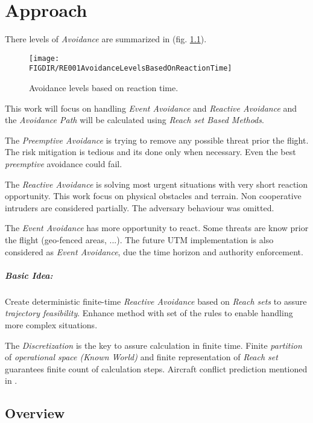 \cleardoublepage
\chapter{Approach}\label{ch:approach}

\noindent There levels of \emph{Avoidance} are summarized in (fig. \ref{s:approachOverview}).

\begin{figure}[H]
    \centering
    \texttt{[image: \\FIGDIR/RE001AvoidanceLevelsBasedOnReactionTime]} 
    \caption{Avoidance levels based on reaction time.}
    \label{fig:AvoidanceLevels}
\end{figure}

\noindent This work will focus on handling \emph{Event Avoidance} and \emph{Reactive Avoidance} and the \emph{Avoidance Path} will be calculated using \emph{Reach set Based Methods}. 

The \emph{Preemptive Avoidance} is trying to remove any possible threat prior the flight. The risk mitigation is tedious and its done only when necessary. Even the best \emph{preemptive} avoidance could fail.

The \emph{Reactive Avoidance} is solving most urgent situations with very short reaction opportunity. This work focus on physical obstacles and terrain. Non cooperative intruders are considered partially. The adversary behaviour was omitted.

The \emph{Event Avoidance} has more opportunity to react. Some threats are know prior the flight (geo-fenced areas, ...). The future UTM implementation is also considered as \emph{Event Avoidance}, due the time horizon and authority enforcement. 

\paragraph{Basic Idea:} Create deterministic finite-time \emph{Reactive Avoidance} based on \emph{Reach sets} to assure \emph{trajectory feasibility}. Enhance method with set of the rules to enable handling more complex situations.

The \emph{Discretization} is the key to assure calculation in finite time. Finite \emph{partition} of \emph{operational space (Known World)} and finite representation of \emph{Reach set} guarantees finite count of calculation steps. Aircraft conflict prediction mentioned in \cite{prandini2008application}.

\newpage    
\section{Overview}\label{s:approachOverview}

